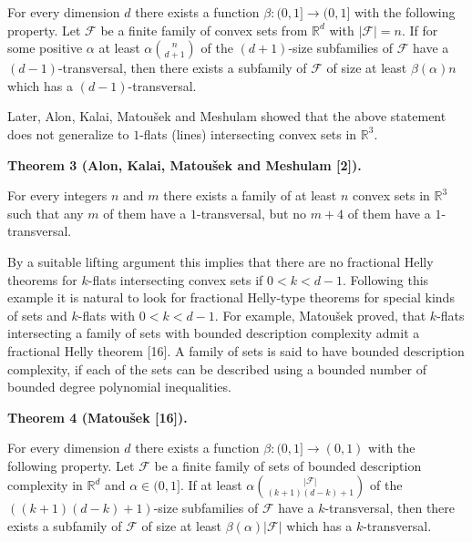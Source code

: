 For every dimension $d$ there exists a function $\beta\colon(0,1]\to(0,1]$ with the following property. Let $\mathcal{F}$ be a finite family of convex sets from $\mathbb{R}^{d}$ with $|\mathcal{F}|=n$. If for some positive $\alpha$ at least $\alpha\binom{n}{d+1}$ of the $(d+1)$-size subfamilies of $\mathcal{F}$ have a $(d-1)$-transversal, then there exists a subfamily of $\mathcal{F}$ of size at least $\beta(\alpha)n$ which has a $(d-1)$-transversal.
\par
\par
\par
Later, Alon, Kalai, Matoušek and Meshulam showed that the above statement does not generalize to $1$-flats (lines) intersecting convex sets in $\mathbb{R}^{3}$.
\par
\par
\par\medskip\noindent\textbf{Theorem 3 (Alon, Kalai, Matoušek and Meshulam [2]).}\par
For every integers $n$ and $m$ there exists a family of at least $n$ convex sets in $\mathbb{R}^{3}$ such that any $m$ of them have a $1$-transversal, but no $m+4$ of them have a $1$-transversal.
\par
\par
\par
By a suitable lifting argument this implies that there are no fractional Helly theorems for $k$-flats intersecting convex sets if $0<k<d-1$. Following this example it is natural to look for fractional Helly-type theorems for special kinds of sets and $k$-flats with $0<k<d-1$. For example, Matoušek proved, that $k$-flats intersecting a family of sets with bounded description complexity admit a fractional Helly theorem [16]. A family of sets is said to have bounded description complexity, if each of the sets can be described using a bounded number of bounded degree polynomial inequalities.
\par
\par
\par\medskip\noindent\textbf{Theorem 4 (Matoušek [16]).}\par
For every dimension $d$ there exists a function $\beta\colon(0,1]\to(0,1)$ with the following property. Let $\mathcal{F}$ be a finite family of sets of bounded description complexity in $\mathbb{R}^{d}$ and $\alpha\in(0,1]$. If at least $\alpha\binom{|\mathcal{F}|}{(k+1)(d-k)+1}$ of the $((k+1)(d-k)+1)$-size subfamilies of $\mathcal{F}$ have a $k$-transversal, then there exists a subfamily of $\mathcal{F}$ of size at least $\beta(\alpha)|\mathcal{F}|$ which has a $k$-transversal.
